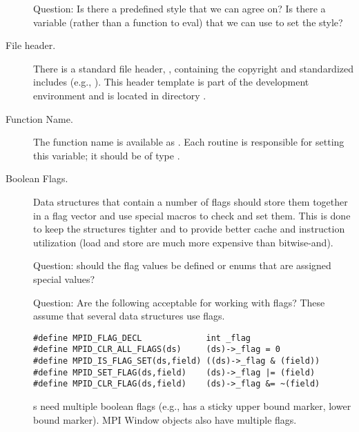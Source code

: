 \documentclass{article}
\begin{document}
\begin{description}
Question: Is there a predefined style that we can agree on?  Is there a
variable (rather than a function to eval) that we can use to set the style?


\item[File header.]
There is a standard file header, , containing the copyright and
standardized includes (e.g., ).  This header
template is part of the development environment and is located in directory
. 

\item[Function Name.]
The function name is available as .  Each routine is responsible
for setting this variable; it should be of type .




\item[Boolean Flags.]
Data structures that contain a number of flags should store them
together in a flag vector and use special macros to check and set
them.  This is done to keep the structures tighter and to provide better cache
and instruction utilization (load and store are much more expensive than
bitwise-and).  

Question: should the flag values be defined or enums that are assigned
special values?

Question: Are the following acceptable for working with flags?  These
assume that several data structures use flags.
\begin{verbatim}
#define MPID_FLAG_DECL             int _flag
#define MPID_CLR_ALL_FLAGS(ds)     (ds)->_flag = 0
#define MPID_IS_FLAG_SET(ds,field) ((ds)->_flag & (field))
#define MPID_SET_FLAG(ds,field)    (ds)->_flag |= (field)
#define MPID_CLR_FLAG(ds,field)    (ds)->_flag &= ~(field)
\end{verbatim}
s need multiple boolean flags (e.g., has a
sticky upper bound marker, lower bound marker).  MPI Window objects also
have multiple flags.


\end{description}
\end{document}
